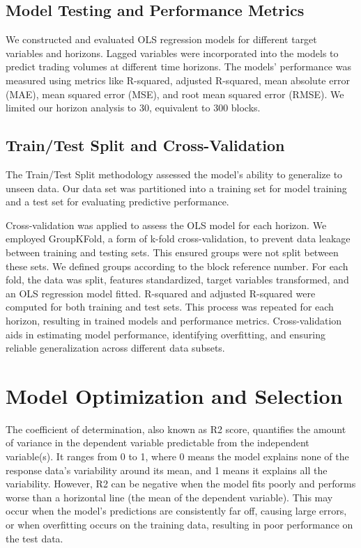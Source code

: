 \documentclass{article}
\begin{document}
\subsection{Model Testing and Performance Metrics}

We constructed and evaluated OLS regression models for different target variables and horizons. Lagged variables were incorporated into the models to predict trading volumes at different time horizons. The models' performance was measured using metrics like R-squared, adjusted R-squared, mean absolute error (MAE), mean squared error (MSE), and root mean squared error (RMSE). We limited our horizon analysis to 30, equivalent to 300 blocks.

\subsection{Train/Test Split and Cross-Validation}

The Train/Test Split methodology assessed the model's ability to generalize to unseen data. Our data set was partitioned into a training set for model training and a test set for evaluating predictive performance.

Cross-validation was applied to assess the OLS model for each horizon. We employed GroupKFold, a form of k-fold cross-validation, to prevent data leakage between training and testing sets. This ensured groups were not split between these sets. We defined groups according to the block reference number. For each fold, the data was split, features standardized, target variables transformed, and an OLS regression model fitted. R-squared and adjusted R-squared were computed for both training and test sets. This process was repeated for each horizon, resulting in trained models and performance metrics. Cross-validation aids in estimating model performance, identifying overfitting, and ensuring reliable generalization across different data subsets.

\section{Model Optimization and Selection}

The coefficient of determination, also known as R2 score, quantifies the amount of variance in the dependent variable predictable from the independent variable(s). It ranges from 0 to 1, where 0 means the model explains none of the response data's variability around its mean, and 1 means it explains all the variability. However, R2 can be negative when the model fits poorly and performs worse than a horizontal line (the mean of the dependent variable). This may occur when the model's predictions are consistently far off, causing large errors, or when overfitting occurs on the training data, resulting in poor performance on the test data.
\end{document}
